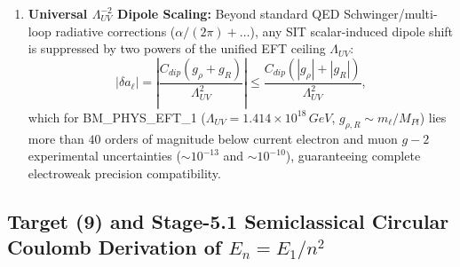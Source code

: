 \documentclass[american,11pt,letterpaper]{article}
\def\mathrm#1{#1}%
\def\texttt#1{#1}%
\begin{document}
\begin{enumerate}[leftmargin=2em]
  \item \textbf{Universal $\Lambda_{\mathrm{UV}}^{-2}$ Dipole Scaling:} Beyond standard QED Schwinger/multi-loop radiative corrections ($\alpha/(2\pi) + \dots$), any SIT scalar-induced dipole shift is suppressed by two powers of the unified EFT ceiling $\Lambda_{\mathrm{UV}}$:
  \begin{equation}
  |\delta a_\ell| = \left|\frac{C_{\mathrm{dip}}(g_\rho + g_R)}{\Lambda_{\mathrm{UV}}^2}\right|
  \le \frac{C_{\mathrm{dip}}(|g_\rho| + |g_R|)}{\Lambda_{\mathrm{UV}}^2},
  \label{eq:g2_uv_suppression}
  \end{equation}
  which for \texttt{BM\_PHYS\_EFT\_1} ($\Lambda_{\mathrm{UV}} = 1.414\times 10^{18}\,\mathrm{GeV}$, $g_{\rho,R} \sim m_\ell / M_{\mathrm{Pl}}$) lies more than $40$ orders of magnitude below current electron and muon $g-2$ experimental uncertainties ($\sim 10^{-13}$ and $\sim 10^{-10}$), guaranteeing complete electroweak precision compatibility.
\end{enumerate}

\subsection{Target (9) and Stage-5.1 Semiclassical Circular Coulomb Derivation of $E_n = E_1/n^2$}
\end{document}
